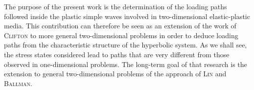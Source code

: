 The purpose of the present work is the determination of the loading paths followed inside the plastic simple waves involved in two-dimensional elastic-plastic media.
This contribution can therefore be seen as an extension of the work of \textsc{Clifton} \cite{Clifton} to more general two-dimensional problems in order to deduce loading paths from the characteristic structure of the hyperbolic system.
As we shall see, the stress states considered lead to paths that are very different from those observed in one-dimensional problems.
The long-term goal of that research is the extension to general two-dimensional problems of the approach of \textsc{Lin} and \textsc{Ballman}.


